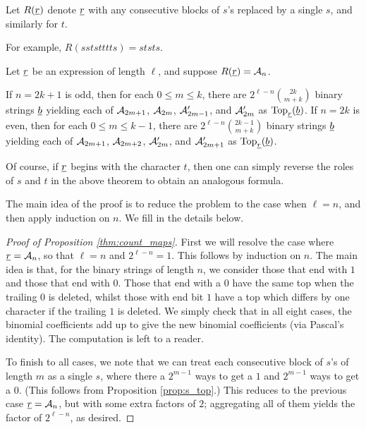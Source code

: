 \begin{definition*}
	Let $R(\ul r)$ denote $\ul r$ with any consecutive blocks of $s$'s replaced by a single $s$, and similarly for $t$.
\end{definition*}
For example, $R(sststttts) = ststs$.

\begin{proposition}
	Let $\ul r$ be an expression of length $\ell$, and suppose $R(\ul r) = \AA_n$.
	\begin{enumerate}[(i)]
		\ii If $n=2k+1$ is odd, then for each $0 \le m \le k$, there are $2^{\ell-n} \binom{2k}{m+k}$ binary strings $\ul b$ yielding each of $\AA_{2m+1}$, $\AA_{2m}$, $\AA_{2m-1}'$, and $\AA_{2m}'$ as $\Top_{\ul r}(\ul b)$.
		\ii If $n=2k$ is even, then for each $0 \le m \le k-1$, there are $2^{\ell-n} \binom{2k-1}{m+k}$ binary strings $\ul b$ yielding each of $\AA_{2m+1}$, $\AA_{2m+2}$, $\AA_{2m}'$, and $\AA_{2m+1}'$ as $\Top_{\ul r}(\ul b)$.
	\end{enumerate}
	\label{thm:count_maps}
\end{proposition}
Of course, if $\ul r$ begins with the character $t$, then one can simply reverse the roles of $s$ and $t$ in the above theorem to obtain an analogous formula.

The main idea of the proof is to reduce the problem to the case when $\ell = n$, and then apply induction on $n$.  We fill in the details below.

\begin{proof}[Proof of Proposition \ref{thm:count_maps}]
	First we will resolve the case where $\ul r = \AA_n$, so that $\ell = n$ and $2^{\ell-n} = 1$.  This follows by induction on $n$.  The main idea is that, for the binary strings of length $n$, we consider those that end with $1$ and those that end with $0$.  Those that end with a $0$ have the same top when the trailing $0$ is deleted, whilst those with end bit $1$ have a top which differs by one character if the trailing $1$ is deleted.  We simply check that in all eight cases, the binomial coefficients add up to give the new binomial coefficients (via Pascal's identity).  The computation is left to a reader.

	To finish to all cases, we note that we can treat each consecutive block of $s$'s of length $m$ as a single $s$, where there a $2^{m-1}$ ways to get a $1$ and $2^{m-1}$ ways to get a $0$.  (This follows from Proposition \ref{prop:s_top}.)  This reduces to the previous case $\ul r = \AA_n$, but with some extra factors of $2$; aggregating all of them yields the factor of $2^{\ell-n}$, as desired.
\end{proof}

